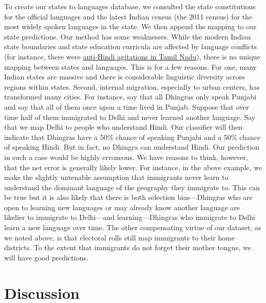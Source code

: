 \documentclass[11pt,  letterpaper]{article}
\begin{document}
To create our states to languages database, we consulted the state constitutions for the official languages and the latest Indian census (the 2011 census) for the most widely spoken languages in the state. We then append the mapping to our state predictions. Our method has some weaknesses. While the modern Indian state boundaries and state education curricula are affected by language conflicts (for instance, there were \href{https://en.wikipedia.org/wiki/Anti-Hindi_agitations_of_Tamil_Nadu}{anti-Hindi agitations in Tamil Nadu}), there is no unique mapping between states and languages. This is for a few reasons. For one, many Indian states are massive and there is considerable linguistic diversity across regions within states. Second, internal migration, especially to urban centers, has transformed many cities. For instance, say that all Dhingras only speak Punjabi and say that all of them once upon a time lived in Punjab. Suppose that over time half of them immigrated to Delhi and never learned another language. Say that we map Delhi to people who understand Hindi. Our classifier will then indicate that Dhingras have a 50\% chance of speaking Punjabi and a 50\% chance of speaking Hindi. But in fact, no Dhingra can understand Hindi. Our prediction in such a case would be highly erroneous. We have reasons to think, however, that the net error is generally likely lower. For instance, in the above example, we make the slightly untenable assumption that immigrants never learn to understand the dominant language of the geography they immigrate to. This can be true but it is also likely that there is both selection bias—Dhingras who are open to learning new languages or may already know another language are likelier to immigrate to Delhi—and learning—Dhingras who immigrate to Delhi learn a new language over time. The other compensating virtue of our dataset, as we noted above, is that electoral rolls still map immigrants to their home districts. To the extent that immigrants do not forget their mother tongue, we will have good predictions. 

\section{Discussion}
\end{document}
